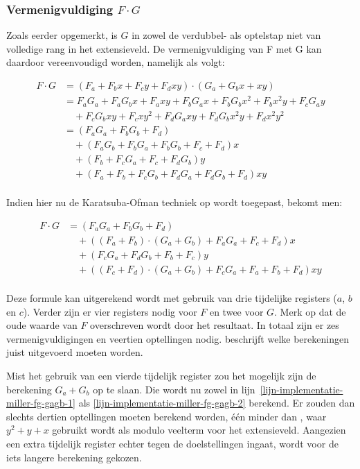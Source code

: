 \subsubsection{Vermenigvuldiging $F \cdot G$}

Zoals eerder opgemerkt, is $G$ in zowel de verdubbel- als optelstap niet van volledige rang in het extensieveld. De vermenigvuldiging van F met G kan daardoor vereenvoudigd worden, namelijk als volgt:

\[\begin{aligned}
F \cdot G	&= (F_a + F_b x + F_c y + F_d xy) \cdot (G_a + G_b x + xy)\\
	&= F_a G_a + F_a G_b x + F_a xy + F_b G_a x + F_b G_b x^2 + F_b x^2y + F_c G_a y\\
		&\quad + F_c G_b xy + F_c xy^2 + F_d G_a xy + F_d G_b x^2y + F_d x^2 y^2\\
	&= (F_a G_a + F_b G_b + F_d)\\
		&\quad + (F_a G_b + F_b G_a + F_b G_b + F_c + F_d)x\\
		&\quad + (F_b + F_c G_a + F_c + F_d G_b)y\\
		&\quad + (F_a + F_b + F_c G_b + F_d G_a + F_d G_b + F_d)xy\\
\end{aligned}\]

Indien hier nu de Karatsuba-Ofman techniek \cite{karatsuba-oldest, zuras} op wordt toegepast, bekomt men:

\[\begin{aligned}
F \cdot G &= (F_a G_a + F_b G_b + F_d)\\
				&\quad + ((F_a + F_b) \cdot (G_a + G_b) + F_a G_a + F_c + F_d)x\\
				&\quad + (F_c G_a + F_d G_b + F_b + F_c)y\\
				&\quad + ((F_c + F_d) \cdot (G_a + G_b) + F_c G_a + F_a + F_b + F_d)xy\\
\end{aligned}\]

Deze formule kan uitgerekend wordt met gebruik van drie tijdelijke registers ($a$, $b$ en $c$). Verder zijn er vier registers nodig voor $F$ en twee voor $G$. Merk op dat de oude waarde van $F$ overschreven wordt door het resultaat. In totaal zijn er zes vermenigvuldigingen en veertien optellingen nodig.  beschrijft welke berekeningen juist uitgevoerd moeten worden.

Mist het gebruik van een vierde tijdelijk register zou het mogelijk zijn de berekening $G_a + G_b$ op te slaan. Die wordt nu zowel in lijn~\ref{lijn-implementatie-miller-fg-gagb-1} als \ref{lijn-implementatie-miller-fg-gagb-2} berekend. Er zouden dan slechts dertien optellingen moeten berekend worden, \'e\'en minder dan \cite{beuchat}, waar $y^2 + y +x$ gebruikt wordt als modulo veelterm voor het extensieveld. Aangezien een extra tijdelijk register echter tegen de doelstellingen ingaat, wordt voor de iets langere berekening gekozen.

